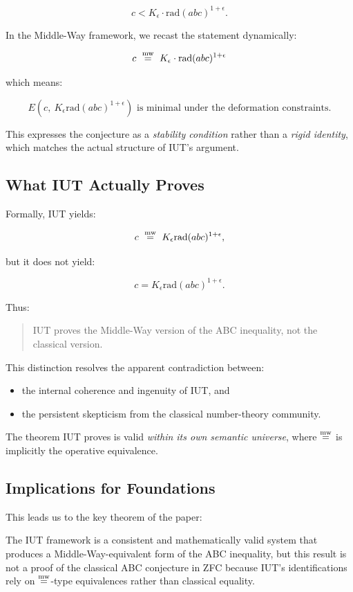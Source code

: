 \documentclass[11pt]{article}
\begin{document}
\[
c < K_{\epsilon} \cdot \mathrm{rad}(abc)^{1+\epsilon}.
\]

In the Middle-Way framework, we recast the statement dynamically:

\[
c \ \mathrel{\overset{\mathrm{mw}}{=}} \ K_{\epsilon} \cdot \mathrm{rad}(abc)^{1+\epsilon}
\]

which means:

\[
E(c,\ K_{\epsilon}\mathrm{rad}(abc)^{1+\epsilon}) 
\text{ is minimal under the deformation constraints.}
\]

This expresses the conjecture as a \emph{stability condition} rather than
a \emph{rigid identity}, which matches the actual structure of IUT's
argument.

\subsection{What IUT Actually Proves}

Formally, IUT yields:

\[
c \ \mweq \ K_{\epsilon}\mathrm{rad}(abc)^{1+\epsilon},
\]

but it does not yield:

\[
c = K_{\epsilon}\mathrm{rad}(abc)^{1+\epsilon}.
\]

Thus:

\begin{quote}
IUT proves the Middle-Way version of the ABC inequality, not the
classical version.
\end{quote}

This distinction resolves the apparent contradiction between:

\begin{itemize}
\item the internal coherence and ingenuity of IUT, and
\item the persistent skepticism from the classical number-theory
community.
\end{itemize}

The theorem IUT proves is valid \emph{within its own semantic universe},
where $\mathrel{\overset{\mathrm{mw}}{=}}$ is implicitly the operative equivalence.

\subsection{Implications for Foundations}

This leads us to the key theorem of the paper:

\begin{theorem}
The IUT framework is a consistent and mathematically valid system that
produces a Middle-Way-equivalent form of the ABC inequality, but this
result is not a proof of the classical ABC conjecture in ZFC because
IUT's identifications rely on $\mathrel{\overset{\mathrm{mw}}{=}}$-type equivalences rather than
classical equality.
\end{theorem}
\end{document}
